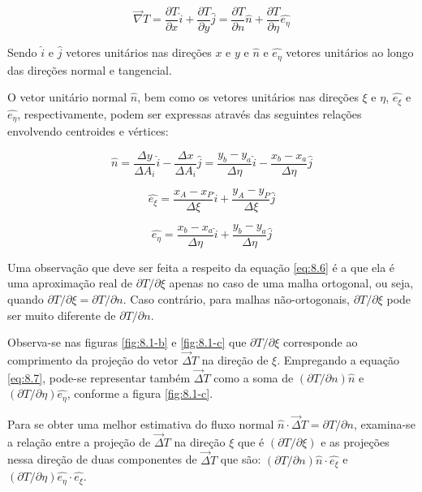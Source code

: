 \begin{equation}
    \label{eq:8.7}
    \vec{\nabla}T = \frac{\partial T}{\partial x}\hat{i} + \frac{\partial T}{\partial y}\hat{j} = \frac{\partial T}{\partial n}\hat{n} + \frac{\partial T}{\partial \eta}\hat{e_\eta}
\end{equation}

Sendo $\hat{i}$ e $\hat{j}$ vetores unitários nas direções $x$ e $y$ e $\hat{n}$ e $\hat{e_\eta}$ vetores unitários ao longo das direções normal e tangencial.

O vetor unitário normal $\hat{n}$, bem como os vetores unitários nas direções $\xi$ e $\eta$, $\hat{e_\xi}$ e $\hat{e_\eta}$, respectivamente, podem ser expressas através das seguintes relações envolvendo centroides e vértices:

\begin{equation}
    \label{eq:8.8}
    \hat{n} = \frac{\Delta y}{\Delta A_i}\hat{i} - \frac{\Delta x}{\Delta A_i}\hat{j} = \frac{y_b - y_a}{\Delta \eta}\hat{i} - \frac{x_b - x_a}{\Delta \eta}\hat{j}
\end{equation}

\begin{equation}
    \label{eq:8.9}
    \hat{e_\xi} = \frac{x_A - x_P}{\Delta \xi}\hat{i} + \frac{y_A - y_P}{\Delta \xi}\hat{j}
\end{equation}

\begin{equation}
    \label{eq:8.10}
    \hat{e_\eta} = \frac{x_b - x_a}{\Delta \eta}\hat{i} + \frac{y_b - y_a}{\Delta \eta}\hat{j}
\end{equation}

Uma observação que deve ser feita a respeito da equação \ref{eq:8.6} é a que ela é uma aproximação real de $\partial T/\partial \xi$ apenas no caso de uma malha ortogonal, ou seja, quando $\partial T/\partial \xi = \partial T/\partial n$. Caso contrário, para malhas não-ortogonais, $\partial T/\partial \xi$ pode ser muito diferente de $\partial T/\partial n$.

Observa-se nas figuras \ref{fig:8.1-b} e \ref{fig:8.1-c} que $\partial T/\partial \xi$ corresponde ao comprimento da projeção do vetor $\vec{\Delta}T$ na direção de $\xi$. Empregando a equação \ref{eq:8.7}, pode-se representar também $\vec{\Delta}T$ como a soma de $(\partial T/\partial n)\hat{n}$ e $(\partial T/\partial \eta)\hat{e_\eta}$, conforme a figura \ref{fig:8.1-c}.

Para se obter uma melhor estimativa do fluxo normal $\hat{n} \cdot \vec{\Delta}T = \partial T/\partial n$, examina-se a relação entre a projeção de $\vec{\Delta}T$ na direção $\xi$ que é $(\partial T/\partial \xi)$ e as projeções nessa direção de duas componentes de $\vec{\Delta}T$ que são: $(\partial T/\partial n)\hat{n} \cdot \hat{e_\xi}$ e $(\partial T/\partial \eta)\hat{e_\eta} \cdot \hat{e_\xi}$.

